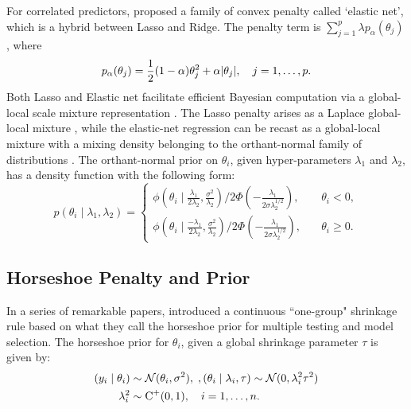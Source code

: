 \documentclass[11pt]{article}
\begin{document}
For correlated predictors, \cite{zou2005regularization} proposed a family of convex penalty called `elastic net', which is a hybrid between Lasso and Ridge. The penalty term is $\sum_{j=1}^{p} \lambda p_{\alpha}(\theta_j)$, where 
\[
p_{\alpha}(\theta_j) = \frac{1}{2} (1-\alpha)\theta_j^2 + \alpha \lvert\theta_j\rvert, \quad j = 1, \ldots, p. 
\]
Both Lasso and Elastic net facilitate efficient Bayesian computation via a global-local scale mixture representation \cite{bhadra2016global}. The Lasso penalty arises as a Laplace global-local mixture \citep{andrews1974scale}, while the elastic-net regression can be recast as a global-local mixture with a mixing density belonging to the orthant-normal family of distributions \citep{hans2011elastic}.  The orthant-normal prior on $\theta_i$, given hyper-parameters $\lambda_1$ and $\lambda_2$, 
has a density function with the following form:
\begin{equation}
  p(\theta_i \mid \lambda_1, \lambda_2)  = 
  \begin{cases} 
   \phi(\theta_i \mid \frac{\lambda_1}{2\lambda_2}, \frac{\sigma^2}{\lambda_2}) / 2\Phi\left(-\frac{\lambda_1}{2\sigma \lambda_2^{1/2} }\right), & \quad \theta_i < 0, \\
   \phi(\theta_i \mid \frac{-\lambda_1}{2\lambda_2}, \frac{\sigma^2}{\lambda_2}) / 2\Phi\left(-\frac{\lambda_1}{2\sigma \lambda_2^{1/2} }\right), & \quad \theta_i \geq 0. \end{cases} 
  \label{eq:hans}
\end{equation}
 

\subsection{Horseshoe Penalty and Prior}\label{sec:one-gp}


In a series of remarkable papers, \citet*{carvalho2009handling, carvalho2010horseshoe, polson2010shrink, polson2012half} introduced a continuous ``one-group" shrinkage rule based on what they call the horseshoe prior for multiple testing and model selection. The horseshoe prior for $\theta_i$, given a global shrinkage parameter $\tau$ is given by: 
\begin{align}
(y_i \mid \theta_i) & \sim {\cal N}(\theta_i , \sigma^2), \;, (\theta_i \mid \lambda_i, \tau) \sim {\cal N}(0, \lambda_i^2 \tau^2) \nonumber \\
\lambda_i ^2 & \sim \operatorname{C}^{+}(0,1), \quad i = 1, \ldots, n. \label{eq:hs}
\end{align}
\end{document}
